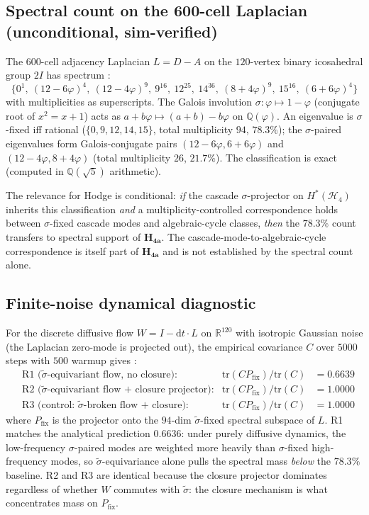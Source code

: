 \documentclass[11pt, a4paper]{amsart}
\theoremstyle{definition}
\newcommand{\R}{\mathbb{R}}
\newcommand{\Q}{\mathbb{Q}}
\newcommand{\HH}{\mathcal{H}}
\begin{document}
\subsection{Spectral count on the 600-cell Laplacian (unconditional, sim-verified)}

The 600-cell adjacency Laplacian $L = D - A$ on the
$120$-vertex binary icosahedral group $2I$ has spectrum
\cite{CascadeAttractorSpectrum}:
\[
  \{0^{1},\ (12{-}6\varphi)^{4},\ (12{-}4\varphi)^{9},\ 9^{16},\
   12^{25},\ 14^{36},\ (8{+}4\varphi)^{9},\ 15^{16},\
   (6{+}6\varphi)^{4}\}
\]
with multiplicities as superscripts.  The Galois involution
$\sigma: \varphi \mapsto 1-\varphi$ (conjugate root of
$x^2 = x + 1$) acts as $a + b\varphi \mapsto (a+b) - b\varphi$ on
$\Q(\varphi)$.  An eigenvalue is $\sigma$-fixed iff rational
($\{0,9,12,14,15\}$, total multiplicity $94$, $\bm{78.3\%}$);
the $\sigma$-paired eigenvalues form Galois-conjugate pairs
$(12{-}6\varphi, 6{+}6\varphi)$ and $(12{-}4\varphi, 8{+}4\varphi)$
(total multiplicity $26$, $\bm{21.7\%}$).  The classification
is exact (computed in $\Q(\sqrt 5)$ arithmetic).

The relevance for Hodge is conditional: \emph{if} the cascade
$\sigma$-projector on $H^*(\HH_4)$ inherits this classification
\emph{and} a multiplicity-controlled correspondence holds between
$\sigma$-fixed cascade modes and algebraic-cycle classes,
\emph{then} the $78.3\%$ count transfers to spectral support of
$\mathbf{H_{4a}}$.  The cascade-mode-to-algebraic-cycle
correspondence is itself part of $\mathbf{H_{4a}}$ and is not
established by the spectral count alone.

\subsection{Finite-noise dynamical diagnostic}

For the discrete diffusive flow $W = I - \mathrm{d}t \cdot L$ on
$\R^{120}$ with isotropic Gaussian noise (the Laplacian zero-mode
is projected out), the empirical covariance $C$ over $5000$ steps
with $500$ warmup gives \cite{CascadeAttractorDynamics}:
\begin{align*}
&\text{R1 ($\widetilde\sigma$-equivariant flow, no closure):}
  &\mathrm{tr}(C P_{\mathrm{fix}})/\mathrm{tr}(C) &= 0.6639 \\
&\text{R2 ($\widetilde\sigma$-equivariant flow + closure projector):}
  &\mathrm{tr}(C P_{\mathrm{fix}})/\mathrm{tr}(C) &= 1.0000 \\
&\text{R3 (control: $\widetilde\sigma$-broken flow + closure):}
  &\mathrm{tr}(C P_{\mathrm{fix}})/\mathrm{tr}(C) &= 1.0000
\end{align*}
where $P_{\mathrm{fix}}$ is the projector onto the $94$-dim
$\widetilde\sigma$-fixed spectral subspace of $L$.  R1 matches
the analytical prediction $0.6636$: under purely diffusive
dynamics, the low-frequency $\sigma$-paired modes are weighted
more heavily than $\sigma$-fixed high-frequency modes, so
$\widetilde\sigma$-equivariance alone pulls the spectral mass
\emph{below} the $78.3\%$ baseline.  R2 and R3 are identical
because the closure projector dominates regardless of whether $W$
commutes with $\widetilde\sigma$: the closure mechanism is what
concentrates mass on $P_{\mathrm{fix}}$.
\end{document}
